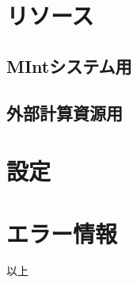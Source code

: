 \documentclass[letterpaper,10pt,dvipdfmx,openany]{sphinxmanual}
\begin{document}
\section{リソース}
\label{\detokenize{using_distributed_properties:id38}}

\subsection{MIntシステム用}
\label{\detokenize{using_distributed_properties:id39}}

\subsection{外部計算資源用}
\label{\detokenize{using_distributed_properties:id40}}

\section{設定}
\label{\detokenize{using_distributed_properties:id41}}

\section{エラー情報}
\label{\detokenize{using_distributed_properties:id42}}
以上

\listoffigures
\listoftables



\renewcommand{\indexname}{索引}
\printindex
\end{document}
